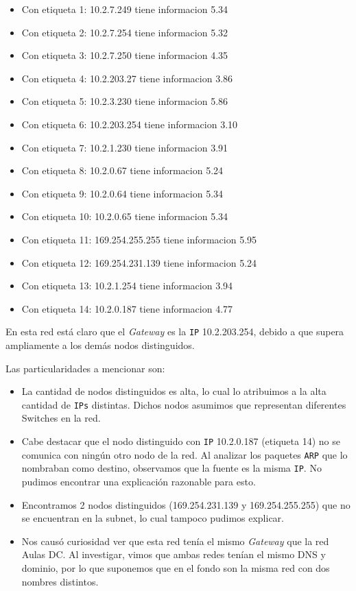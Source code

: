 \begin{itemize}
    \item Con etiqueta 1: 10.2.7.249 tiene informacion 5.34
    \item Con etiqueta 2: 10.2.7.254 tiene informacion 5.32
    \item Con etiqueta 3: 10.2.7.250 tiene informacion 4.35
    \item Con etiqueta 4: 10.2.203.27 tiene informacion 3.86
    \item Con etiqueta 5: 10.2.3.230 tiene informacion 5.86
    \item Con etiqueta 6: 10.2.203.254 tiene informacion 3.10
    \item Con etiqueta 7: 10.2.1.230 tiene informacion 3.91
    \item Con etiqueta 8: 10.2.0.67 tiene informacion 5.24
    \item Con etiqueta 9: 10.2.0.64 tiene informacion 5.34
    \item Con etiqueta 10: 10.2.0.65 tiene informacion 5.34
    \item Con etiqueta 11: 169.254.255.255 tiene informacion 5.95
    \item Con etiqueta 12: 169.254.231.139 tiene informacion 5.24
    \item Con etiqueta 13: 10.2.1.254 tiene informacion 3.94
    \item Con etiqueta 14: 10.2.0.187 tiene informacion 4.77
\end{itemize}

En esta red está claro que el \textit{Gateway} es la \texttt{IP} 10.2.203.254, debido a que
supera ampliamente a los demás nodos distinguidos.

Las particularidades a mencionar son:
\begin{itemize}
    \item La cantidad de nodos distinguidos es alta, lo cual lo atribuimos a la alta
        cantidad de \texttt{IPs} distintas.
        Dichos nodos asumimos que representan diferentes Switches en la red.
    \item Cabe destacar que el nodo distinguido con \texttt{IP} 10.2.0.187 (etiqueta 14)
        no se comunica con ningún otro nodo de la red. Al analizar los paquetes \texttt{ARP} que lo nombraban como
        destino, observamos que la fuente es la misma \texttt{IP}. No pudimos encontrar una explicación razonable para
        esto.
    \item Encontramos 2 nodos distinguidos (169.254.231.139 y 169.254.255.255) que no
        se encuentran en la subnet, lo cual tampoco pudimos explicar.
    \item Nos causó curiosidad ver que esta red tenía el mismo \textit{Gateway} que la red
        Aulas DC. Al investigar, vimos que ambas redes tenían el mismo DNS y dominio, por lo que suponemos
        que en el fondo son la misma red con dos nombres distintos.
\end{itemize}

